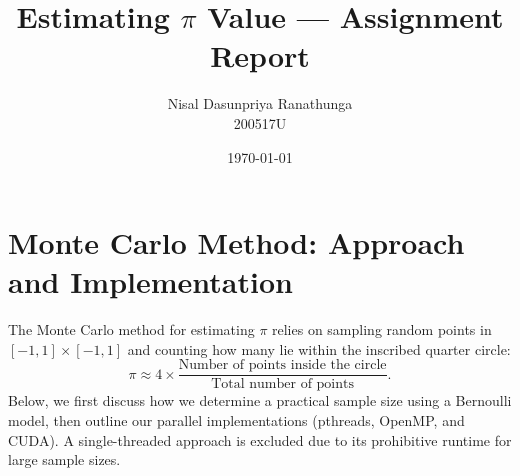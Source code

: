 \documentclass[12pt]{article}
\title{Estimating \(\pi\) Value --- Assignment Report}
\author{Nisal Dasunpriya Ranathunga \\ 200517U}
\date{\today}
\begin{document}
\maketitle



\section{Monte Carlo Method: Approach and Implementation}\label{sec:monte-carlo-impl}

The Monte Carlo method for estimating \(\pi\) relies on sampling random points
in \([-1,1]\times[-1,1]\) and counting how many lie within the inscribed
quarter circle:
\[
    \pi \approx 4 \times \frac{\text{Number of points inside the circle}}{\text{Total number of points}}.
\]
Below, we first discuss how we determine a practical sample size using a
Bernoulli model, then outline our parallel implementations (pthreads, OpenMP,
and CUDA). A single-threaded approach is excluded due to its prohibitive
runtime for large sample sizes.
\end{document}
